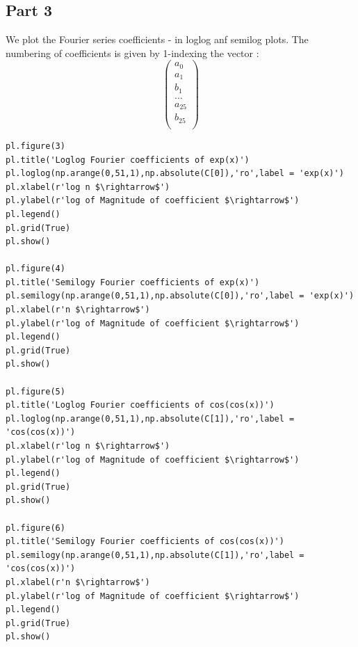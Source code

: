 \documentclass[11pt, a4paper]{article}
\begin{document}
\subsection{Part 3}
We plot the Fourier series coefficients - in loglog anf semilog plots.
The numbering of coefficients is given by 1-indexing the vector :
$$
\begin{pmatrix}
a_0 \\
a_1 \\
b_1 \\
... \\
a_{25} \\
b_{25} \\
\end{pmatrix}
$$
\begin{verbatim}
pl.figure(3)
pl.title('Loglog Fourier coefficients of exp(x)')
pl.loglog(np.arange(0,51,1),np.absolute(C[0]),'ro',label = 'exp(x)')
pl.xlabel(r'log n $\rightarrow$')
pl.ylabel(r'log of Magnitude of coefficient $\rightarrow$')
pl.legend()
pl.grid(True)
pl.show()

pl.figure(4)
pl.title('Semilogy Fourier coefficients of exp(x)')
pl.semilogy(np.arange(0,51,1),np.absolute(C[0]),'ro',label = 'exp(x)')
pl.xlabel(r'n $\rightarrow$')
pl.ylabel(r'log of Magnitude of coefficient $\rightarrow$')
pl.legend()
pl.grid(True)
pl.show()

pl.figure(5)
pl.title('Loglog Fourier coefficients of cos(cos(x))')
pl.loglog(np.arange(0,51,1),np.absolute(C[1]),'ro',label = 'cos(cos(x))')
pl.xlabel(r'log n $\rightarrow$')
pl.ylabel(r'log of Magnitude of coefficient $\rightarrow$')
pl.legend()
pl.grid(True)
pl.show()

pl.figure(6)
pl.title('Semilogy Fourier coefficients of cos(cos(x))')
pl.semilogy(np.arange(0,51,1),np.absolute(C[1]),'ro',label = 'cos(cos(x))')
pl.xlabel(r'n $\rightarrow$')
pl.ylabel(r'log of Magnitude of coefficient $\rightarrow$')
pl.legend()
pl.grid(True)
pl.show()
\end{verbatim}
\end{document}

